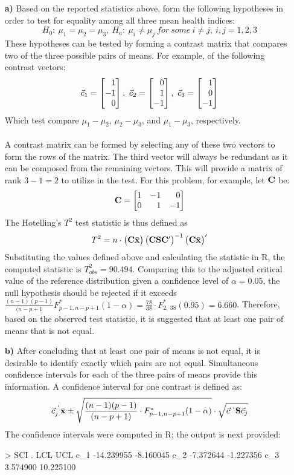 \begin{enumerate}
\item[\bf{a)}] 
Based on the reported statistics above, form the following hypotheses in order to test for equality among all three mean health indices: $$H_0:\ \mu_1=\mu_2=\mu_3,\ H_a:\ \mu_i \neq \mu_j\ for\ some\ i \neq j,\ i,j=1, 2, 3$$ These hypotheses can be tested by forming a contrast matrix that compares two of the three possible pairs of means. For example, of the following contrast vectors: $$\vec{c}_1 = \m{1\\-1\\0},\ \vec{c}_2 = \m{0\\1\\-1},\ \vec{c}_3 = \m{1\\0\\-1}$$ Which test compare $\mu_1 - \mu_2$, $\mu_2 - \mu_3$, and $\mu_1 - \mu_3$, respectively. \\
\\
A contrast matrix can be formed by selecting any of these two vectors to form the rows of the matrix. The third vector will always be redundant as it can be composed from the remaining vectors. This will provide a matrix of rank $3 - 1 = 2$ to utilize in the test. For this problem, for example, let $\mathrm{\bf{C}}$ be: $$\mf{C}=\m{1&-1&0\\0&1&-1}$$ The Hotelling's $T^2$ test statistic is thus defined as $$T^2=n \cdot \begin{pmatrix}\mathrm{\bf{C}}\bar{\bf{x}}\end{pmatrix} \begin{pmatrix}\mathrm{\bf{C}}\mathrm{\bf{S}}\mathrm{\bf{C'}}\end{pmatrix}^{-1} \begin{pmatrix}\mathrm{\bf{C}}\bar{\bf{x}}\end{pmatrix}'$$ Substituting the values defined above and calculating the statistic in R, the computed statistic is $T^2_{obs}=90.494$. Comparing this to the adjusted critical value of the reference distribution given a confidence level of $\alpha = 0.05$, the null hypothesis should be rejected if it exceeds $\frac{(n-1)(p-1)}{(n-p+1}F_{p-1,n-p+1}^*(1-\alpha) = \frac{78}{38} \cdot F_{2,\ 38}^*(0.95) = 6.660$. Therefore, based on the observed test statistic, it is suggested that at least one pair of means that is not equal.

\item[\bf{b)}] 
	After concluding that at least one pair of means is not equal, it is desirable to identify exactly which pairs are not equal. Simultaneous confidence intervals for each of the three pairs of means provide this information. A confidence interval for one contrast is defined as: $$\vec{c}_j^{\ '}\bar{\bf{x}} \pm \sqrt{\frac{(n-1)(p-1)}{(n-p+1)} \cdot F_{p-1,n-p+1}^*(1-\alpha)} \cdot \sqrt{\vec{c}^{\ '}\mathrm{\bf{S}}\vec{c}_j}$$ The confidence intervals were computed in R; the output is next provided:
\begin{rc}
	> SCI
	.          LCL       UCL
	c_1 -14.239955 -8.160045
	c_2  -7.372644 -1.227356
	c_3   3.574900 10.225100
	

\end{rc}
\end{enumerate}
